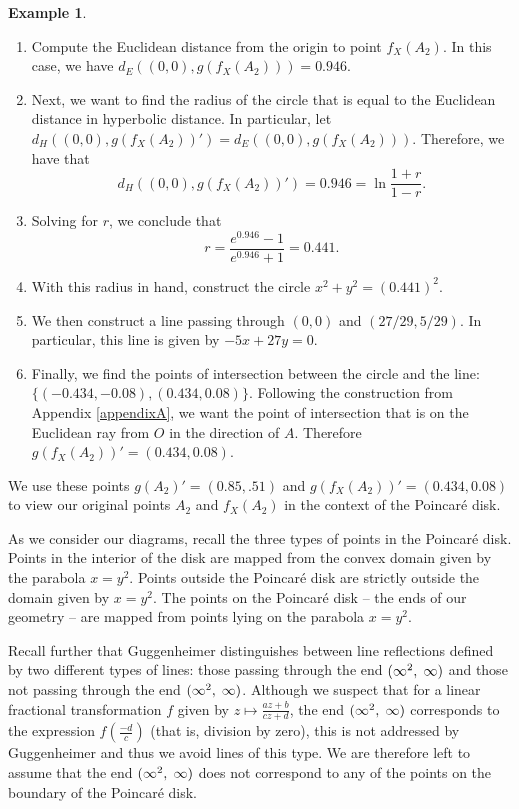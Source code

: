 \documentclass[12pt]{article}
\newcommand{\ttc}{, \hspace{1mm}}
\newcommand{\poincare}{Poincar\'{e} }
\newcommand{\specialend}{(\infty^2\ttc\infty)}
\theoremstyle{plain}
\theoremstyle{definition}
\newtheorem{example}[theorem]{Example}
\begin{document}
\begin{example}
\begin{enumerate}
	\item Compute the Euclidean distance from the origin to point $f_X(A_2)$. In this case, we have $d_E((0,0),g(f_X(A_2))) = 0.946$.
	\item Next, we want to find the radius of the circle that is equal to the Euclidean distance in hyperbolic distance. In particular, let $d_H((0,0), g(f_X(A_2))') = d_E((0,0), g(f_X(A_2)))$. Therefore, we have that
	\[
		d_H((0,0), g(f_X(A_2))') = 0.946 = \ln\frac{1 + r}{1 - r}.
	\]
	\item Solving for $r$, we conclude that 
	\[
		r = \frac{e^{0.946} - 1}{e^{0.946} + 1} = 0.441.
	\]
	\item With this radius in hand, construct the circle $x^2 + y^2 = (0.441)^2$.
	\item We then construct a line passing through $(0,0)$ and $(27/29,5/29)$. In particular, this line is given by $-5x + 27y = 0$. 
	\item Finally, we find the points of intersection between the circle and the line: $\{(-0.434,-0.08),(0.434,0.08)\}$. Following the construction from Appendix \ref{appendixA}, we want the point of intersection that is on the Euclidean ray from $O$ in the direction of $A$. Therefore $g(f_X(A_2))' = (0.434, 0.08)$. 
\end{enumerate}

We use these points $g(A_2)' = (0.85, .51)$ and $g(f_X(A_2))' = (0.434, 0.08)$ to view our original points $A_2$ and $f_X(A_2)$ in the context of the \poincare disk.

\end{example}

As we consider our diagrams, recall the three types of points in the \poincare disk. Points in the interior of the disk are mapped from the convex domain given by the parabola $x = y^2$. Points outside the \poincare disk are strictly outside the domain given by $x = y^2$. The points on the \poincare disk -- the ends of our geometry -- are mapped from points lying on the parabola $x=y^2$.

Recall further that Guggenheimer distinguishes between line reflections defined by two different types of lines: those passing through the end $\specialend$ and those not passing through the end $\specialend$. Although we suspect that for a linear fractional transformation $f$ given by $z \mapsto \frac{az+b}{cz+d}$, the end $\specialend$ corresponds to the expression $f(\frac{-d}{c})$ (that is, division by zero), this is not addressed by Guggenheimer and thus we avoid lines of this type. We are therefore left to assume that the end $\specialend$ does not correspond to any of the points on the boundary of the \poincare disk. 
\end{document}
